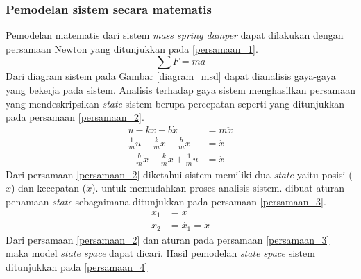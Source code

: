 \documentclass[../main.tex]{subfiles}
\begin{document}
            \subsubsection{Pemodelan sistem secara matematis}
                Pemodelan matematis dari sistem \textit{mass spring damper} dapat dilakukan dengan persamaan Newton yang ditunjukkan pada \eqref{persamaan_1}.
                \begin{equation}
                    \sum F = ma
                    \label{persamaan_1}
                \end{equation}
                Dari diagram sistem pada Gambar \ref{diagram_msd} dapat dianalisis gaya-gaya yang bekerja pada sistem. Analisis terhadap gaya sistem menghasilkan persamaan yang mendeskripsikan \textit{state} sistem berupa percepatan seperti yang ditunjukkan pada persamaan \eqref{persamaan_2}.
                \begin{equation}
                    \begin{split}
                        u - kx - b\dot{x} &= m\ddot{x}\\[5pt]
                        \frac{1}{m}u - \frac{k}{m}x - \frac{b}{m}\dot{x} &= \ddot{x} \\[5pt]
                        -\frac{b}{m}\dot{x} - \frac{k}{m}x + \frac{1}{m}u &= \ddot{x}
                        \label{persamaan_2}
                    \end{split}
                \end{equation}
                Dari persamaan \eqref{persamaan_2} diketahui sistem memiliki dua \textit{state} yaitu posisi ($x$) dan kecepatan ($\dot{x}$). untuk memudahkan proses analisis sistem. dibuat aturan penamaan \textit{state} sebagaimana ditunjukkan pada persamaan \eqref{persamaan_3}.
                \begin{equation}
                    \begin{split}
                        x_1 &= x\\[5pt]
                        x_2 &= \dot{x_1} = \dot{x}
                        \label{persamaan_3}
                    \end{split}
                \end{equation}
                Dari persamaan \eqref{persamaan_2} dan aturan pada persamaan \eqref{persamaan_3} maka model \textit{state space} dapat dicari. Hasil pemodelan \textit{state space} sistem ditunjukkan pada \eqref{persamaan_4}
\end{document}
